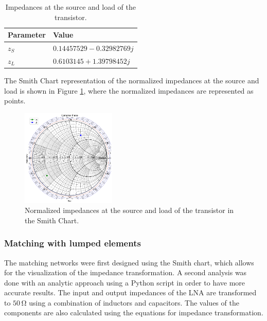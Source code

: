 \begin{table}[H]
    \centering
    \caption{Impedances at the source and load of the transistor.}
    \begin{tabularx}{\textwidth}{>{\centering\arraybackslash}X >{\centering\arraybackslash}X}
        \toprule
        \textbf{Parameter} & \textbf{Value} \\
        \midrule
        $z_{S}$     & $0.14457529-0.32982769j$ \\
        \midrule
        $z_{L}$     & $0.6103145+1.39798452j$\\
        \bottomrule
    \end{tabularx}
    \label{tab:Impedances}
\end{table}

The Smith Chart representation of the normalized impedances at the source and load is shown in Figure \ref{fig:ZsZl}, where the normalized impedances are represented as points.
\begin{figure}[H]
    \centering
    \includegraphics[width=0.4\textwidth]{Images/ZsZl-smithChart.png}
    \caption{Normalized impedances at the source and load of the transistor in the Smith Chart.}
    \label{fig:ZsZl}
\end{figure}



\subsubsection{Matching with lumped elements}

The matching networks were first designed using the Smith chart, which allows for the visualization of the impedance transformation. A second analysis was done with an analytic approach using a Python script in order to have more accurate results. The input and output impedances of the LNA are transformed to $50\,\si{\ohm}$ using a combination of inductors and capacitors. The values of the components are also calculated using the equations for impedance transformation. 

